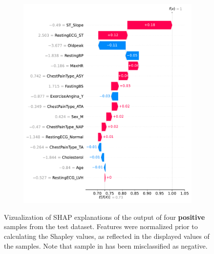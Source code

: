 \begin{figure}
\begin{subfigure}{1\columnwidth}
        \includegraphics[width=1\textwidth]{images/shap_sample_positive_4.pdf}
        \caption{}
    \end{subfigure}
    \caption{Vizualization of SHAP explanations of the output of four \textbf{positive} samples from the test dataset. Features were normalized prior to calculating the Shapley values, as reflected in the displayed values of the samples. Note that sample in \protect{} has been misclassified as negative.}
    \label{fig:shap_sample_positive}
\end{figure}
